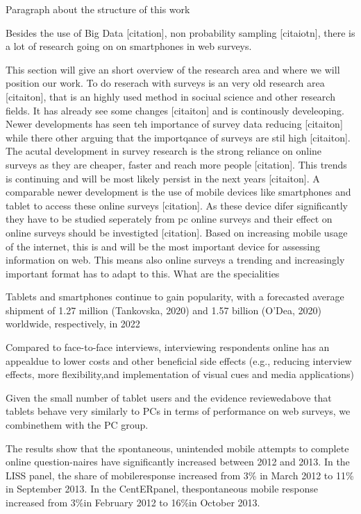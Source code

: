 Paragraph about the structure of this work


Besides the use of Big Data [citation], non probability sampling [citaiotn], there is a lot of research going on on smartphones in web surveys.\cite{couper_is_2013}

This section will give an short overview of the research area and where we will position our work. To do reserach with surveys is an very old research area [citaiton], that is an highly used method in sociual science and other research fields. It has already see some changes [citaiton] and is continously develeoping. Newer developments has seen teh importance of survey data reducing [citaiton] while there other arguing that the importqance of surveys are stil high [citaiton]. The acutal development in survey research  is the strong reliance on online surveys as they are cheaper, faster and reach more people [citation]. This trends is continuing and will be most likely persist in the next years [citaiton]. A comparable newer development is the use of mobile devices like smartphones and tablet to access these online surveys [citation]. As these device difer significantly they have to be studied seperately from pc online surveys and their effect on online surveys should be investigted [citation].
Based on increasing mobile usage of the internet, this is and will be the most important device for assessing information on web. This means also online surveys a trending and increasingly important format has to adapt to this. What are the specialities

Tablets and smartphones continue to gain popularity, with a forecasted average shipment of 1.27 million (Tankovska, 2020) and 1.57 billion (O’Dea, 2020) worldwide, respectively, in 2022 \cite{weigold_computerized_2021}

Compared to face-to-face interviews, interviewing respondents online has an appealdue to lower costs and other beneficial side effects (e.g., reducing interview effects, more flexibility,and implementation of visual cues and media applications) \cite{gummer_does_2019}

Given the small number of tablet users and the evidence reviewedabove that tablets behave very similarly to PCs in terms of performance on web surveys, we combinethem with the PC group. \cite{couper_why_2017}

The results show that the spontaneous, unintended mobile attempts to complete online question-naires have significantly increased between 2012 and 2013. In the LISS panel, the share of mobileresponse increased from 3\% in March 2012 to 11\% in September 2013. In the CentERpanel, thespontaneous mobile response increased from 3\%in February 2012 to 16\%in October 2013. \cite{de_bruijne_mobile_2014}


